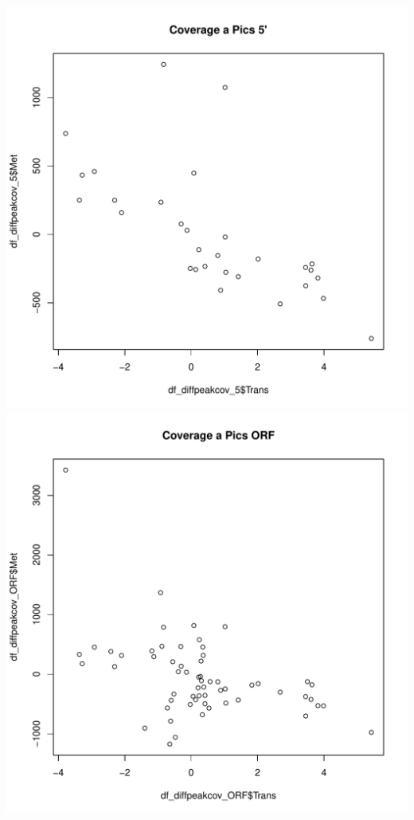\documentclass{article}\usepackage[]{graphicx}\usepackage[]{color}
\makeatletter
\def\maxwidth{ %
  \ifdim\Gin@nat@width>\linewidth
    \linewidth
  \else
    \Gin@nat@width
  \fi
}
\newenvironment{knitrout}{}{} %
\makeatother
\begin{document}
\begin{knitrout}
{\includegraphics[width=\maxwidth]{figure/minimal-correlacions_met-7} 
\includegraphics[width=\maxwidth]{figure/minimal-correlacions_met-8} 
}
\end{knitrout}
\end{document}

